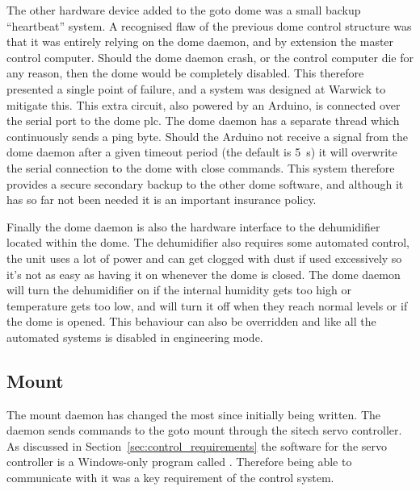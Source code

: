 \begin{colsection}
\begin{colsection}
The other hardware device added to the \gls{goto} dome was a small backup ``heartbeat'' system. A recognised flaw of the previous dome control structure was that it was entirely relying on the dome daemon, and by extension the master control computer. Should the dome daemon crash, or the control computer die for any reason, then the dome would be completely disabled. This therefore presented a single point of failure, and a system was designed at Warwick to mitigate this. This extra circuit, also powered by an Arduino, is connected over the serial port to the dome \gls{plc}. The dome daemon has a separate thread which continuously sends a ping byte. Should the Arduino not receive a signal from the dome daemon after a given timeout period (the default is \SI{5}{\second}) it will overwrite the serial connection to the dome with close commands. This system therefore provides a secure secondary backup to the other dome software, and although it has so far not been needed it is an important insurance policy.


Finally the dome daemon is also the hardware interface to the dehumidifier located within the dome. The dehumidifier also requires some automated control, the unit uses a lot of power and can get clogged with dust if used excessively so it's not as easy as having it on whenever the dome is closed. The dome daemon will turn the dehumidifier on if the internal humidity gets too high or temperature gets too low, and will turn it off when they reach normal levels or if the dome is opened. This behaviour can also be overridden and like all the automated systems is disabled in engineering mode.

\end{colsection}


\subsection{Mount}
\label{sec:mount}
\begin{colsection}

The mount daemon has changed the most since initially being written. The daemon sends commands to the \gls{goto} mount through the \gls{sitech} servo controller. As discussed in Section~\ref{sec:control_requirements} the software for the servo controller is a Windows-only program called . Therefore being able to communicate with it was a key requirement of the control system.


\end{colsection}
\end{colsection}
